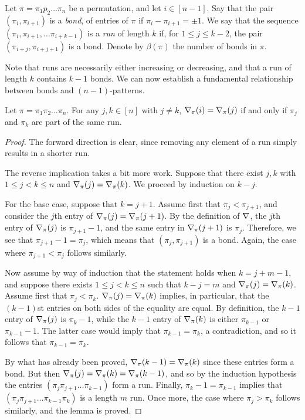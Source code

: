     \begin{definition} 
      Let $\pi = \pi_1p_2 \dots \pi_n$ be a permutation, and let $i \in [n-1]$. Say
      that the pair $(\pi_i, \pi_{i+1})$ is a \emph{bond}, of entries of $\pi$ if
      $\pi_i - \pi_{i+1} = \pm 1$. We say that the sequence $(\pi_i, \pi_{i+1}, \dots
      \pi_{i+k-1})$ is a \emph{run} of length $k$ if, for $1 \leq j \leq k-2$,
      the pair $(\pi_{i+j},\pi_{i+j+1})$ is a bond. Denote by $\beta(\pi)$ the
      number of bonds in $\pi$. 
    \end{definition}
  
    Note that runs are necessarily either increasing or decreasing, and that a run
    of length $k$ contains $k-1$ bonds. We can now establish a fundamental
    relationship between bonds and $(n-1)$-patterns. 

    \begin{lemma} \label{fixpat:lem:bonds}
      Let $\pi = \pi_1 \pi_2 \dots \pi_n$. For any $j,k \in [n]$ with $j \neq
      k$, $\nabla_\pi(i) = \nabla_\pi(j)$ if and only if $\pi_j$ and $\pi_k$ are
      part of the same run. 
    \end{lemma}
    \begin{proof}
      The forward direction is clear, since removing any element of a run
      simply results in a shorter run. 

      The reverse implication takes a bit more work. Suppose that there exist
      $j,k$ with $1 \leq j < k \leq n$ and $\nabla_\pi(j) = \nabla_\pi(k)$. We
      proceed by induction on $k-j$. 

      For the base case, suppose that $k =j+ 1$. Assume first that $\pi_j <
      \pi_{j+1}$, and consider the $j$th entry of $\nabla_\pi(j)=\nabla_\pi(j+1)$. By
      the definition of $\nabla$, the $j$th entry of $\nabla_\pi(j)$ is
      $\pi_{j+1}-1$, and the same entry in $\nabla_\pi(j+1)$ is $\pi_j$. Therefore,
      we see that $\pi_{j+1}-1=\pi_j$, which means that $(\pi_j,\pi_{j+1})$ is
      a bond. Again, the case where $\pi_{j+1}<\pi_j$ follows similarly. 

      Now assume by way of induction that the statement holds when $k=j+m-1$,
      and suppose there exists $1\leq j < k \leq n$ such that $k-j = m$ and
      $\nabla_\pi(j)=\nabla_\pi(k)$. Assume first that $\pi_j < \pi_{k}$.
      $\nabla_\pi(j)=\nabla_\pi(k)$ implies, in particular, that the $(k-1)$st entries
      on both sides of the equality are equal.  By definition, the $k-1$ entry
      of $\nabla_\pi(j)$ is $\pi_k-1$, while the $k-1$ entry of $\nabla_\pi(k)$ is
      either $\pi_{k-1}$ or $\pi_{k-1}-1$. The latter case would imply that
      $\pi_{k-1} = \pi_k$, a contradiction, and so it follows that $\pi_{k-1} =
      \pi_k$. 

      By what has already been proved, $\nabla_\pi(k-1) = \nabla_\pi(k)$ since these
      entries form a bond. But then $\nabla_\pi(j) = \nabla_\pi(k) = \nabla_\pi(k-1)$, and
      so by the induction hypothesis the entries $(\pi_j \pi_{j+1} \dots
      \pi_{k-1})$ form a run. Finally, $\pi_k - 1 = \pi_{k-1}$ implies that
      $(\pi_j \pi_{j+1} \dots \pi_{k-1} \pi_k)$ is a length $m$ run.  Once
      more, the case where $\pi_j > \pi_k$ follows similarly, and the lemma is
      proved.
    \end{proof}

